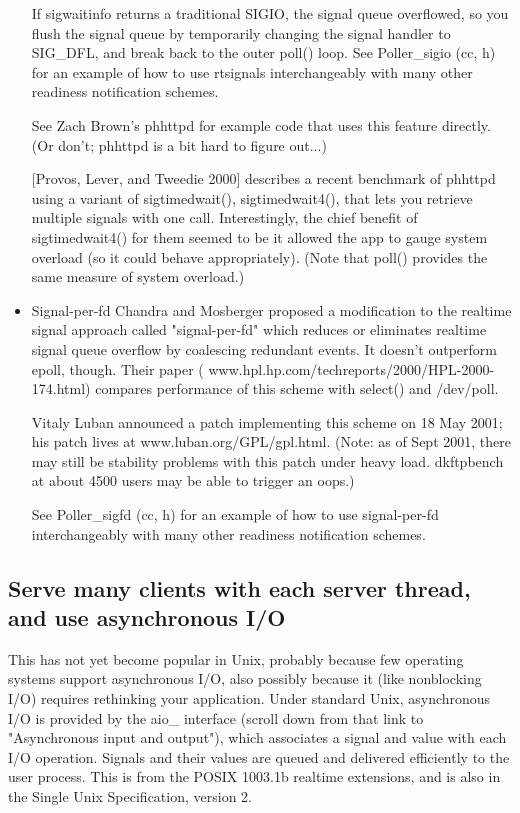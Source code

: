\documentclass[12pt, twoside, a4paper, xetex]{report}
\begin{document}
\begin{itemize}
If sigwaitinfo returns a traditional SIGIO, the signal queue overflowed, so you flush the signal queue by temporarily changing the signal handler to SIG\_DFL, and break back to the outer poll() loop. 
See Poller\_sigio (cc, h) for an example of how to use rtsignals interchangeably with many other readiness notification schemes.

See Zach Brown's phhttpd for example code that uses this feature directly. (Or don't; phhttpd is a bit hard to figure out...)

[Provos, Lever, and Tweedie 2000] describes a recent benchmark of phhttpd using a variant of sigtimedwait(), sigtimedwait4(), that lets you retrieve multiple signals with one call. Interestingly, the chief benefit of sigtimedwait4() for them seemed to be it allowed the app to gauge system overload (so it could behave appropriately). (Note that poll() provides the same measure of system overload.)

\item Signal-per-fd
Chandra and Mosberger proposed a modification to the realtime signal approach called "signal-per-fd" which reduces or eliminates realtime signal queue overflow by coalescing redundant events. It doesn't outperform epoll, though. Their paper ( www.hpl.hp.com/techreports/2000/HPL-2000-174.html) compares performance of this scheme with select() and /dev/poll.

Vitaly Luban announced a patch implementing this scheme on 18 May 2001; his patch lives at www.luban.org/GPL/gpl.html. (Note: as of Sept 2001, there may still be stability problems with this patch under heavy load. dkftpbench at about 4500 users may be able to trigger an oops.)

See Poller\_sigfd (cc, h) for an example of how to use signal-per-fd interchangeably with many other readiness notification schemes.

\end{itemize}
\subsection*{Serve many clients with each server thread, and use asynchronous I/O}

This has not yet become popular in Unix, probably because few operating systems support asynchronous I/O, also possibly because it (like nonblocking I/O) requires rethinking your application. Under standard Unix, asynchronous I/O is provided by the aio\_ interface (scroll down from that link to "Asynchronous input and output"), which associates a signal and value with each I/O operation. Signals and their values are queued and delivered efficiently to the user process. This is from the POSIX 1003.1b realtime extensions, and is also in the Single Unix Specification, version 2.
\end{document}
